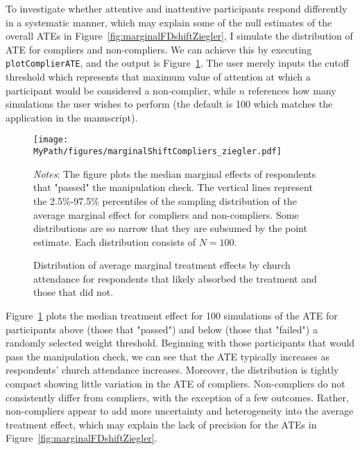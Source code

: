 \documentclass[12pt,letterpaper]{article}
\newcommand*{\MyPath}{../../}%
\begin{document}
To investigate whether attentive and inattentive participants respond differently in a systematic manner, which may explain some of the null estimates of the overall ATEs in Figure~\ref{fig:marginalFDshiftZiegler}, I simulate the distribution of ATE for compliers and non-compliers. We can achieve this by executing \texttt{\footnotesize plotComplierATE}, and the output is Figure~\ref{fig:marginalShiftCompliers_ziegler}. The user merely inputs the cutoff threshold which represents that maximum value of attention at which a participant would be considered a non-complier, while $n$ references how many simulations the user wishes to perform (the default is 100 which matches the application in the manuscript).
\newpage


\begin{figure}[h!]
	\centering
	\caption{\footnotesize{Distribution of average marginal treatment effects by church attendance for respondents that likely absorbed the treatment and those that did not.}}
	\label{fig:marginalShiftCompliers_ziegler}
	\texttt{[image: \\MyPath/figures/marginalShiftCompliers\_ziegler.pdf]}\\
	\vspace{.1cm}
	
	\raggedright   \footnotesize{\textit{Notes}: The figure plots the median marginal effects of respondents that "passed" the manipulation check. The vertical lines represent the 2.5\%-97.5\% percentiles of the sampling distribution of the average marginal effect for compliers and non-compliers.  Some distributions are so narrow that they are subsumed by the point estimate. Each distribution consists of $N=100$.
	}\\
\end{figure}

Figure~\ref{fig:marginalShiftCompliers_ziegler} plots the median treatment effect for 100 simulations of the ATE for participants above (those that "passed") and below (those that "failed") a randomly selected weight threshold. Beginning with those participants that would pass the manipulation check, we can see that the ATE typically increases as respondents' church attendance increases. Moreover, the distribution is tightly compact showing little variation in the ATE of compliers. Non-compliers do not consistently differ from compliers, with the exception of a few outcomes. Rather, non-compliers appear to add more uncertainty and heterogeneity into the average treatment effect, which may explain the lack of precision for the ATEs in Figure~\ref{fig:marginalFDshiftZiegler}.
\end{document}
